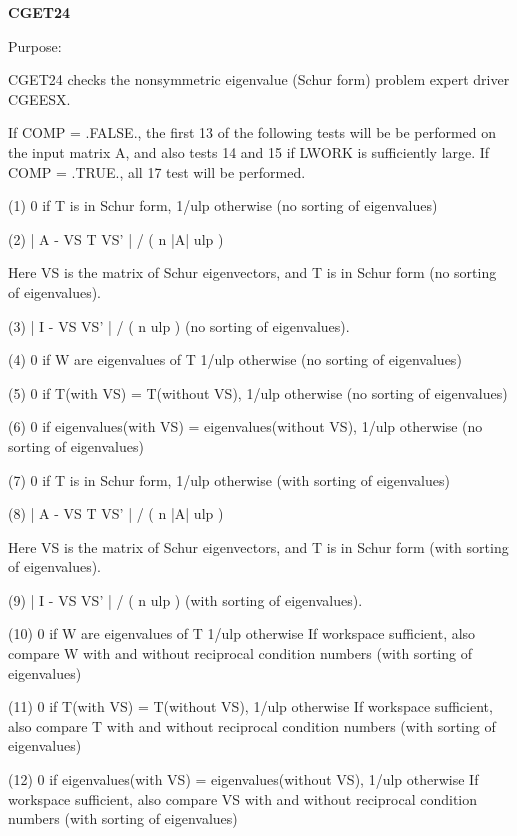 {\bfseries C\+G\+E\+T24} 

\begin{DoxyParagraph}{Purpose\+: }
\begin{DoxyVerb}    CGET24 checks the nonsymmetric eigenvalue (Schur form) problem
    expert driver CGEESX.

    If COMP = .FALSE., the first 13 of the following tests will be
    be performed on the input matrix A, and also tests 14 and 15
    if LWORK is sufficiently large.
    If COMP = .TRUE., all 17 test will be performed.

    (1)     0 if T is in Schur form, 1/ulp otherwise
           (no sorting of eigenvalues)

    (2)     | A - VS T VS' | / ( n |A| ulp )

      Here VS is the matrix of Schur eigenvectors, and T is in Schur
      form  (no sorting of eigenvalues).

    (3)     | I - VS VS' | / ( n ulp ) (no sorting of eigenvalues).

    (4)     0     if W are eigenvalues of T
            1/ulp otherwise
            (no sorting of eigenvalues)

    (5)     0     if T(with VS) = T(without VS),
            1/ulp otherwise
            (no sorting of eigenvalues)

    (6)     0     if eigenvalues(with VS) = eigenvalues(without VS),
            1/ulp otherwise
            (no sorting of eigenvalues)

    (7)     0 if T is in Schur form, 1/ulp otherwise
            (with sorting of eigenvalues)

    (8)     | A - VS T VS' | / ( n |A| ulp )

      Here VS is the matrix of Schur eigenvectors, and T is in Schur
      form  (with sorting of eigenvalues).

    (9)     | I - VS VS' | / ( n ulp ) (with sorting of eigenvalues).

    (10)    0     if W are eigenvalues of T
            1/ulp otherwise
            If workspace sufficient, also compare W with and
            without reciprocal condition numbers
            (with sorting of eigenvalues)

    (11)    0     if T(with VS) = T(without VS),
            1/ulp otherwise
            If workspace sufficient, also compare T with and without
            reciprocal condition numbers
            (with sorting of eigenvalues)

    (12)    0     if eigenvalues(with VS) = eigenvalues(without VS),
            1/ulp otherwise
            If workspace sufficient, also compare VS with and without
            reciprocal condition numbers
            (with sorting of eigenvalues)


\end{DoxyVerb}
\end{DoxyParagraph}
